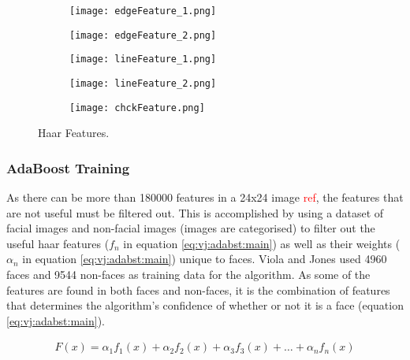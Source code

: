 \documentclass{article}
\newcommand{\rf}[1]{\textcolor{red}{#1}}
\begin{document}
\begin{figure}[h]
    \begin{subfigure}{0.19\textwidth}
        \texttt{[image: edgeFeature\_1.png]} 
    \end{subfigure}
    \begin{subfigure}{0.19\textwidth}
        \texttt{[image: edgeFeature\_2.png]}
    \end{subfigure}
    \begin{subfigure}{0.19\textwidth}
        \texttt{[image: lineFeature\_1.png]}
    \end{subfigure}
    \begin{subfigure}{0.19\textwidth}
        \texttt{[image: lineFeature\_2.png]}
    \end{subfigure}
    \begin{subfigure}{0.19\textwidth}
        \texttt{[image: chckFeature.png]}
    \end{subfigure}
    \caption{Haar Features.}
    \label{fig:vj:edgehaar}
\end{figure}

\subsubsection{AdaBoost Training}

As there can be more than 180000 features in a 24x24 image \rf{ref}, the features that are not useful must be filtered out.  This is accomplished by using a dataset of facial images and non-facial images (images are categorised) to filter out the useful haar features ($f_n$ in equation \ref{eq:vj:adabst:main}) as well as their weights ($\alpha_{n}$ in equation \ref{eq:vj:adabst:main}) unique to faces.  Viola and Jones used 4960 faces and 9544 non-faces as training data for the algorithm.  As some of the features are found in both faces and non-faces, it is the combination of features that determines the algorithm's confidence of whether or not it is a face (equation \ref{eq:vj:adabst:main}). 

\begin{align}
    F(x)=\alpha_{1} f_{1}(x)+\alpha_{2} f_{2}(x)+\alpha_{3} f_{3}(x)+\ldots+\alpha_{n} f_{n}(x) \label{eq:vj:adabst:main}
\end{align}
\end{document}
